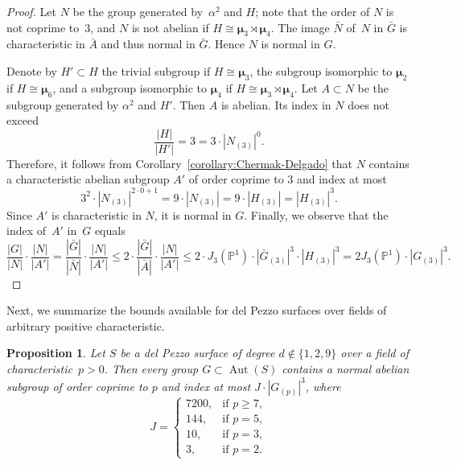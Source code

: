 \documentclass[12pt]{amsart}
\numberwithin{equation}{section}
\newtheorem{proposition}[subsection]{Proposition}
\theoremstyle{definition}
\newcommand{\mumu}{\boldsymbol{\mu}}
\newcommand{\PP}{\mathbb P}
\DeclareMathOperator{\Aut}{Aut}
\def \ge {\geqslant}
\def \le {\leqslant}
\begin{document}
\begin{proof}
Let $N$ be the group
generated by~$\alpha^2$ and $H$; note that the order of $N$ is not
coprime to~$3$, and $N$ is not abelian if $H\cong\mumu_3\rtimes\mumu_4$.
The image $\bar{N}$ of~$N$ in $\bar{G}$ is characteristic in $\bar{A}$
and thus normal in $\bar{G}$. Hence $N$ is normal in $G$.

Denote by $H'\subset H$ the trivial subgroup if $H\cong\mumu_3$,
the subgroup isomorphic to $\mumu_2$ if $H\cong\mumu_6$,
and a subgroup isomorphic to $\mumu_4$ if $H\cong\mumu_3\rtimes\mumu_4$.
Let $A\subset N$ be the subgroup generated by $\alpha^2$ and $H'$.
Then $A$ is abelian.
Its index in $N$ does not exceed
$$
\frac{|H|}{|H'|}=3=3\cdot |N_{(3)}|^0.
$$
Therefore, it follows from Corollary~\ref{corollary:Chermak-Delgado} that
$N$ contains a characteristic abelian subgroup $A'$ of order coprime to $3$
and index at most
$$
3^2\cdot |N_{(3)}|^{2\cdot 0+1}=9\cdot |N_{(3)}|
=9\cdot |H_{(3)}|=|H_{(3)}|^3.
$$
Since $A'$ is characteristic in $N$, it is normal in $G$.
Finally, we observe that the index of~$A'$ in~$G$ equals
$$
\frac{|G|}{|N|}\cdot \frac{|N|}{|A'|}=
\frac{|\bar{G}|}{|\bar{N}|}\cdot \frac{|N|}{|A'|}\le
2\cdot \frac{|\bar{G}|}{|\bar{A}|}\cdot \frac{|N|}{|A'|}\le
2\cdot J_3(\PP^1)\cdot |\bar{G}_{(3)}|^3\cdot |H_{(3)}|^3=
2J_3(\PP^1)\cdot |G_{(3)}|^3.
$$
\end{proof}

Next, we summarize the bounds available for del Pezzo surfaces over fields of arbitrary
positive characteristic.

\begin{proposition}\label{proposition:dP}
Let $S$ be a del Pezzo surface of degree $d\not\in\{1, 2, 9\}$ over a field
of characteristic~\mbox{$p>0$}.
Then every group $G\subset\Aut(S)$ contains a normal abelian subgroup of order coprime to $p$
and index at most
$J\cdot |G_{(p)}|^3$, where
\begin{equation}\label{eq:J-dP}
J=\begin{cases}
7200, &\text{if\ } p\ge 7,\\
144, &\text{if\ } p=5,\\
10, &\text{if\ } p=3,\\
3, &\text{if\ } p=2.
\end{cases}
\end{equation}
\end{proposition}
\end{document}
